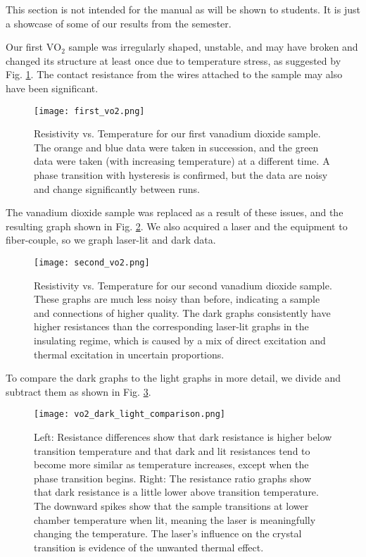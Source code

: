 \documentclass{article}
\begin{document}
This section is not intended for the manual as will be shown to students. It is just a showcase of some of our results from the semester.

Our first $\mathrm{VO_2}$ sample was irregularly shaped, unstable, and may have broken and changed its structure at least once due to temperature stress, as suggested by Fig. \ref{fig:first_vo2_graph}. The contact resistance from the wires attached to the sample may also have been significant.

\begin{figure}
    \centering
    \texttt{[image: first\_vo2.png]}
    \caption{Resistivity vs. Temperature for our first vanadium dioxide sample. The orange and blue data were taken in succession, and the green data were taken (with increasing temperature) at a different time. A phase transition with hysteresis is confirmed, but the data are noisy and change significantly between runs.}
    \label{fig:first_vo2_graph}
\end{figure}

The vanadium dioxide sample was replaced as a result of these issues, and the resulting graph shown in Fig. \ref{fig:second_vo2_graph}. We also acquired a laser and the equipment to fiber-couple, so we graph laser-lit and dark data.


\begin{figure}
    \centering
    \texttt{[image: second\_vo2.png]}
    \caption{Resistivity vs. Temperature for our second vanadium dioxide sample. These graphs are much less noisy than before, indicating a sample and connections of higher quality. The dark graphs consistently have higher resistances than the corresponding laser-lit graphs in the insulating regime, which is caused by a mix of direct excitation and thermal excitation in uncertain proportions.}
    \label{fig:second_vo2_graph}
\end{figure}

To compare the dark graphs to the light graphs in more detail, we divide and subtract them as shown in Fig. \ref{fig:vo2_dark_light}.

\begin{figure}
    \centering
    \texttt{[image: vo2\_dark\_light\_comparison.png]}
    \caption{Left: Resistance differences show that dark resistance is higher below transition temperature and that dark and lit resistances tend to become more similar as temperature increases, except when the phase transition begins. Right: The resistance ratio graphs show that dark resistance is a little lower above transition temperature. The downward spikes show that the sample transitions at lower chamber temperature when lit, meaning the laser is meaningfully changing the temperature. The laser's influence on the crystal transition is evidence of the unwanted thermal effect.}
    \label{fig:vo2_dark_light}
\end{figure}
\end{document}
